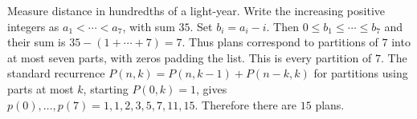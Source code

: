 Measure distance in hundredths of a light-year. Write the increasing positive integers as $a_1<\cdots<a_7$, with sum $35$. Set $b_i=a_i-i$. Then $0\le b_1\le\cdots\le b_7$ and their sum is $35-(1+\cdots+7)=7$. Thus plans correspond to partitions of $7$ into at most seven parts, with zeros padding the list. This is every partition of $7$. The standard recurrence $P(n,k)=P(n,k-1)+P(n-k,k)$ for partitions using parts at most $k$, starting $P(0,k)=1$, gives $p(0),\ldots,p(7)=1,1,2,3,5,7,11,15$. Therefore there are $\boxed{15}$ plans.
